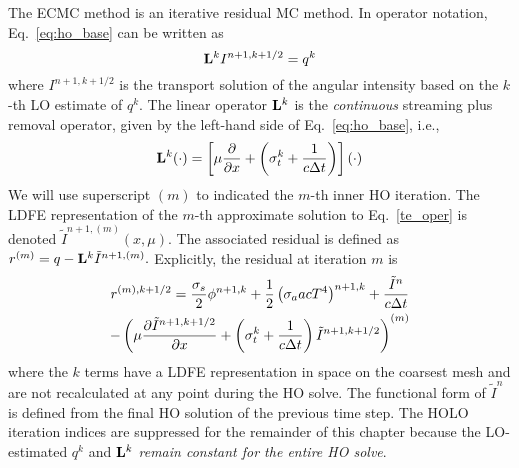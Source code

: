 The ECMC method is an iterative residual MC method. 
In operator notation, Eq.~\eqref{eq:ho_base} can be written as
\begin{equation}\label{te_oper}
\mathbf{L}^k I^{n+1,k+1/2}  = q^{k}
\end{equation}
where $I^{n+1,k+1/2}$ is the transport solution of the angular intensity based on the
$k$-th LO estimate of $q^k$.
The linear operator $\mathbf{L}^k$ is the \emph{continuous} streaming plus
removal operator, given by the left-hand
side of Eq.~\eqref{eq:ho_base}, i.e.,
\begin{equation}
    \mathbf{L}^k(\cdot) = \left[\mu \frac{\partial }{\partial x} + \left(\sigma_t^k + \frac{1}{c \Delta t
    }\right)\right] \left(\cdot\right)
\end{equation}
We will use superscript $(m)$ to indicated the $m$-th inner HO iteration.  The LDFE
representation of the $m$-th
approximate solution to Eq.~\eqref{te_oper} is denoted
$\tilde{I}^{n+1,(m)}(x,\mu)$.    
The associated residual is defined as $r^{(m)} = q - \mathbf{L}^k\tilde{I}^{n+1,(m)}.$ 
Explicitly, the residual at iteration $m$ is
\begin{multline}\label{eq:resid}
r^{(m),k+1/2} = \frac{\sigma_s}{2} \phi^{n+1,k} +\frac{1}{2} \left(\sigma_a a c T^4
\right)^{n+1,k} + \frac{\tilde{I}^n}{c \Delta t } \\ -
\left(\mu \frac{\partial \tilde{I}^{n+1,k+1/2}}{\partial x} +
\left(\sigma_t^k + \frac{1}{c \Delta t }\right) \tilde{I}^{n+1,k+1/2}\right)^{(m)}
\end{multline}
where the $k$ terms have a LDFE representation in space on the coarsest mesh and are not recalculated at any point during
the HO solve. The functional form of $\tilde{I}^n$ is defined from the final HO
solution of the previous time step.  The HOLO iteration indices are suppressed for the
remainder of this chapter because the LO-estimated $q^{k}$ and $\mathbf{L}^{k}$
\emph{remain constant for the entire HO solve}.

